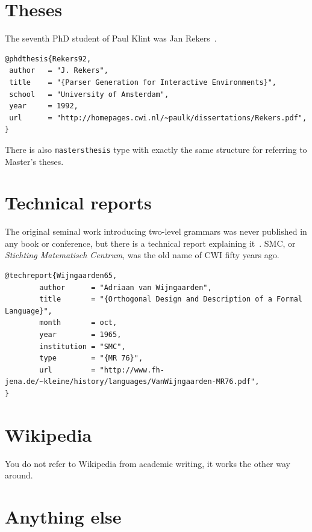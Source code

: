 \documentclass{uvamscse}
\begin{document}
\section{Theses}

The seventh PhD student of Paul Klint was Jan Rekers~\cite{Rekers92}.

\begin{snippet}
\begin{verbatim}
@phdthesis{Rekers92,
 author   = "J. Rekers",
 title    = "{Parser Generation for Interactive Environments}",
 school   = "University of Amsterdam",
 year     = 1992,
 url      = "http://homepages.cwi.nl/~paulk/dissertations/Rekers.pdf",
}
\end{verbatim}
\end{snippet}

There is also \texttt{mastersthesis} type with exactly the same structure for
referring to Master's theses.

\section{Technical reports}

The original seminal work introducing two-level grammars was never published
in any book or conference, but there is a technical report explaining
it~\cite{Wijngaarden65}. SMC, or \emph{Stichting Matematisch Centrum}, was the
old name of CWI fifty years ago.

\begin{snippet}
\begin{verbatim}
@techreport{Wijngaarden65,
        author      = "Adriaan van Wijngaarden",
        title       = "{Orthogonal Design and Description of a Formal Language}",
        month       = oct,
        year        = 1965,
        institution = "SMC",
        type        = "{MR 76}",
        url         = "http://www.fh-jena.de/~kleine/history/languages/VanWijngaarden-MR76.pdf",
}
\end{verbatim}
\end{snippet}

\section{Wikipedia}

You do not refer to Wikipedia from academic writing, it works the other way around.

\section{Anything else}
\end{document}
